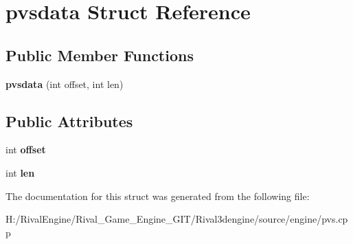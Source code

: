 \hypertarget{structpvsdata}{}\section{pvsdata Struct Reference}
\label{structpvsdata}
\subsection*{Public Member Functions}
\begin{DoxyCompactItemize}
\item 
\mbox{\label{structpvsdata_a8f2c3b18739a0c9f8be6b0ac3fc24786}} 
{\bfseries pvsdata} (int offset, int len)
\end{DoxyCompactItemize}
\subsection*{Public Attributes}
\begin{DoxyCompactItemize}
\item 
\mbox{\label{structpvsdata_a8aa98deef2ed774cdebb63210bc7e1de}} 
int {\bfseries offset}
\item 
\mbox{\label{structpvsdata_a7432901c80ad8b5de2a6425c9861edfe}} 
int {\bfseries len}
\end{DoxyCompactItemize}


The documentation for this struct was generated from the following file\+:\begin{DoxyCompactItemize}
\item 
H\+:/\+Rival\+Engine/\+Rival\+\_\+\+Game\+\_\+\+Engine\+\_\+\+G\+I\+T/\+Rival3dengine/source/engine/pvs.\+cpp\end{DoxyCompactItemize}
